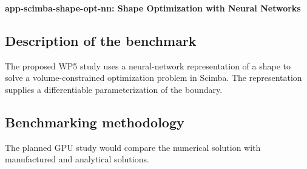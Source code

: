 \textbf{app-scimba-shape-opt-nn: Shape Optimization with Neural Networks}
\label{sec:app:specs:app-scimba-shape-opt-nn}



\subsection{Description of the benchmark}
The proposed WP5 study uses a neural-network representation of a shape
to solve a volume-constrained optimization problem in Scimba. The
representation supplies a differentiable parameterization of the
boundary.

\subsection{Benchmarking methodology}
The planned GPU study would compare the numerical solution with
manufactured and analytical solutions.
